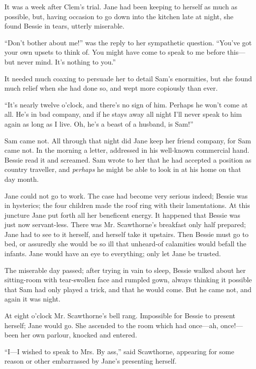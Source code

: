 It was a week after Clem's trial. Jane had been keeping to herself as
much as possible, but, having occasion to go down into the kitchen late
at night, she found Bessie in tears, utterly miserable.

``Don't bother about me!'' was the reply to her sympathetic question.
``You've got {}your own upsets to think of. You might have come to speak
to me before this---but never mind. It's nothing to you.''

It needed much coaxing to persuade her to detail Sam's enormities, but
she found much relief when she had done so, and wept more copiously than
ever.

``It's nearly twelve o'clock, and there's no sign of him. Perhaps he
won't come at all. He's in bad company, and if he stays away all night
I'll never speak to him again as long as I live. Oh, he's a beast of a
husband, is Sam!''

Sam came not. All through that night did Jane keep her friend company,
for Sam came not. In the morning a letter, addressed in his well-known
commercial hand. Bessie read it and screamed. Sam wrote to her that he
had accepted a position as country traveller, and \emph{perhaps} he
might be able to look in at his home on that day month.

Jane could not go to work. The case had become very serious indeed;
Bessie was in hysterics; the four children made the roof ring with their
lamentations. At this juncture Jane put forth all her beneficent energy.
{}It happened that Bessie was just now servant-less. There was Mr.
Scawthorne's breakfast only half prepared; Jane had to see to it
herself, and herself take it upstairs. Then Bessie must go to bed, or
assuredly she would be so ill that unheard-of calamities would befall
the infants. Jane would have an eye to everything; only let Jane be
trusted.

The miserable day passed; after trying in vain to sleep, Bessie walked
about her sitting-room with tear-swollen face and rumpled gown, always
thinking it possible that Sam had only played a trick, and that he would
come. But he came not, and again it was night.

At eight o'clock Mr. Scawthorne's bell rang. Impossible for Bessie to
present herself; Jane would go. She ascended to the room which had
once---ah, once!---been her own parlour, knocked and entered.

``I---I wished to speak to Mrs. By ass,'' said Scawthorne, appearing for
some reason or other embarrassed by Jane's presenting herself.

